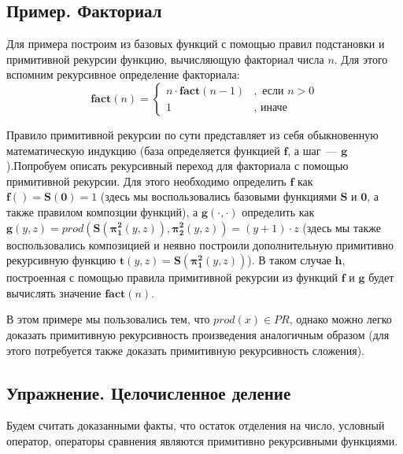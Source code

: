 \documentclass[
    11pt,
    a4paper
]{article}
\theoremstyle{definition}
\begin{document}
\subsection{Пример. Факториал}
Для примера построим из базовых функций с помощью правил подстановки и примитивной рекурсии функцию, вычисляющую факториал числа $n$. Для этого вспомним рекурсивное определение факториала:
$$\mathbf{fact}(n) = \begin{cases} n \cdot \mathbf{fact}(n - 1) &, \text{ если } n > 0\\ 1&, \text{ иначе }\end{cases}$$

Правило примитивной рекурсии по сути представляет из себя обыкновенную математическую индукцию (база определяется функцией $\mathbf{f}$, а шаг~--- $\mathbf{g}$).Попробуем описать рекурсивный переход для факториала с помощью примитивной рекурсии. Для этого необходимо определить $\mathbf{f}$ как $\mathbf{f}() = \mathbf{S}(\mathbf{0}) = 1$ (здесь мы воспользовались базовыми функциями $\mathbf{S}$ и $\mathbf{0}$, а также правилом композции функций), а $\mathbf{g}(\cdot, \cdot)$ определить как $\mathbf{g}(y, z) = prod(\mathbf{S}(\mathbf{\pi_1^2}(y, z)), \mathbf{\pi_2^2}(y, z)) = (y + 1) \cdot z$ (здесь мы также воспользовались композицией и неявно построили дополнительную примитивно рекурсивную функцию $\mathbf{t}(y, z) = \mathbf{S}(\mathbf{\pi_1^2}(y, z))$). В таком случае $\mathbf{h}$, построенная с помощью правила примитивной рекурсии из функций $\mathbf{f}$ и $\mathbf{g}$ будет вычислять значение $\mathbf{fact}(n)$. 

В этом примере мы пользовались тем, что $prod(x) \in \mathit{PR}$, однако можно легко доказать примитивную рекурсивность произведения аналогичным образом (для этого потребуется также доказать примитивную рекурсивность сложения).

\subsection{Упражнение. Целочисленное деление}

Будем считать доказанными факты, что остаток отделения на число, условный оператор, операторы сравнения являются примитивно рекурсивными функциями.
 
\end{document}
